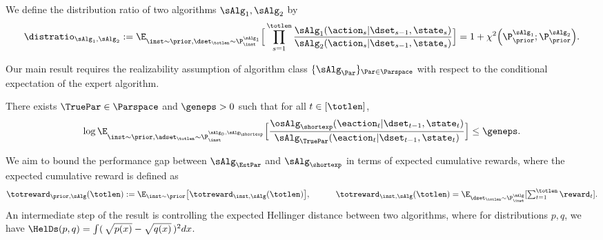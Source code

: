 \documentclass[10pt]{article}
\begin{document}
\begin{definition}\label{def:dist_ratio}
\label{def:distribution-ratio}
We define the distribution ratio of two algorithms $\sAlg_1,\sAlg_2$ by
\begin{align*}\distratio_{\sAlg_1,\sAlg_2}
:=
\E_{\inst\sim\prior,\dset_\totlen\sim\P_\inst^{\sAlg_1}}
\Big[\prod_{s=1}^{\totlen}\frac{\sAlg_1(\action_s|\dset_{s-1},\state_s)}{\sAlg_2(\action_s|\dset_{s-1},\state_s)}\Big] = 1 + \chi^2\Big( \P_\prior^{\sAlg_1};\P_\prior^{\sAlg_2} \Big).
\end{align*}
\end{definition}


Our main result requires the realizability assumption of algorithm class $\{ \sAlg_\Par\}_{\Par \in \Parspace}$ with respect to the conditional expectation of the expert algorithm.

\begin{assumption}
\label{asp:realizability}
There exists $\TruePar\in\Parspace$ and $\geneps > 0$ such that for all $t\in[\totlen]$,
\begin{align}
\label{eqn:plc_approx_general}
\log\E_{\inst \sim \prior, \adset_\totlen \sim \P_{\inst}^{\sAlg_0,\sAlg_\shortexp}}\Big[\frac{\osAlg_{\shortexp}(\eaction_t|\dset_{t-1},\state_t )}{\sAlg_\TruePar(\eaction_t|\dset_{t-1},\state_t )}\Big] \le \geneps.
\end{align}
\end{assumption}


We aim to bound the performance gap between $\sAlg_{\EstPar}$ and $\sAlg_\shortexp$ in terms of expected cumulative rewards, where the expected cumulative reward is defined as
\begin{align*}
\textstyle \totreward_{\prior,\sAlg}(\totlen)
:= \E_{\inst\sim\prior}\big[\totreward_{\inst,\sAlg}(\totlen) \big],~~~~~~~~~ \totreward_{\inst,\sAlg}(\totlen) = \E_{\dset_{\totlen} \sim\P^{\sAlg}_\inst}[\sum_{t=1}^\totlen \reward_t].
\end{align*}
An intermediate step of the result is controlling the expected Hellinger distance between two algorithms, where for distributions $p, q$, we have $\HelDs(p, q) = \int (\,\sqrt{p(x)} - \sqrt{q(x)} \,)^2 d x$.
\end{document}

